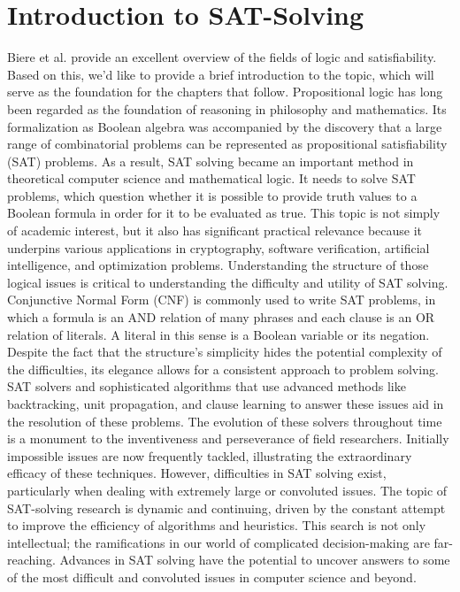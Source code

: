 \documentclass[bachelor, english]{algothesis}
\begin{document}
\section{Introduction to SAT-Solving}
Biere et al. \cite{Sat_solving} provide an excellent overview of the fields of logic and satisfiability. Based on this, we'd like to provide a brief introduction to the topic, which will serve as the foundation for the chapters that follow. 
\newline
Propositional logic has long been regarded as the foundation of reasoning in philosophy and mathematics. Its formalization as Boolean algebra was accompanied by the discovery that a large range of combinatorial problems can be represented as propositional satisfiability (SAT) problems. As a result, SAT solving became an important method in theoretical computer science and mathematical logic. It needs to solve SAT problems, which question whether it is possible to provide truth values to a Boolean formula in order for it to be evaluated as true. This topic is not simply of academic interest, but it also has significant practical relevance because it underpins various applications in cryptography, software verification, artificial intelligence, and optimization problems. Understanding the structure of those logical issues is critical to understanding the difficulty and utility of SAT solving. \newline
Conjunctive Normal Form (CNF) is commonly used to write SAT problems, in which a formula is an AND relation of many phrases and each clause is an OR relation of literals. A literal in this sense is a Boolean variable or its negation. Despite the fact that the structure's simplicity hides the potential complexity of the difficulties, its elegance allows for a consistent approach to problem solving. SAT solvers and sophisticated algorithms that use advanced methods like backtracking, unit propagation, and clause learning to answer these issues aid in the resolution of these problems. The evolution of these solvers throughout time is a monument to the inventiveness and perseverance of field researchers. Initially impossible issues are now frequently tackled, illustrating the extraordinary efficacy of these techniques. However, difficulties in SAT solving exist, particularly when dealing with extremely large or convoluted issues. \newline
The topic of SAT-solving research is dynamic and continuing, driven by the constant attempt to improve the efficiency of algorithms and heuristics. This search is not only intellectual; the ramifications in our world of complicated decision-making are far-reaching. Advances in SAT solving have the potential to uncover answers to some of the most difficult and convoluted issues in computer science and beyond.
\end{document}
